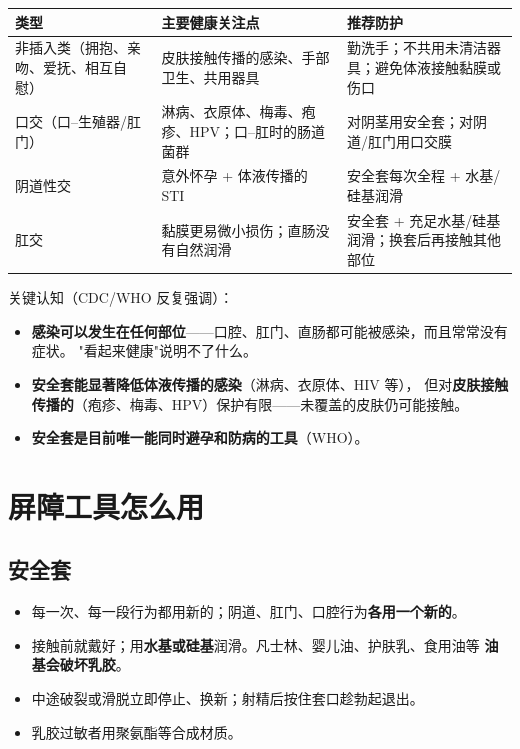 \begin{center}
\begin{tabularx}{\linewidth}{@{}l X X@{}}
\toprule
\textbf{类型} & \textbf{主要健康关注点} & \textbf{推荐防护} \\
\midrule
非插入类（拥抱、亲吻、爱抚、相互自慰）
  & 皮肤接触传播的感染、手部卫生、共用器具
  & 勤洗手；不共用未清洁器具；避免体液接触黏膜或伤口 \\
\addlinespace
口交（口--生殖器/肛门）
  & 淋病、衣原体、梅毒、疱疹、HPV；口--肛时的肠道菌群
  & 对阴茎用安全套；对阴道/肛门用口交膜 \\
\addlinespace
阴道性交
  & 意外怀孕 + 体液传播的 STI
  & 安全套每次全程 + 水基/硅基润滑 \\
\addlinespace
肛交
  & 黏膜更易微小损伤；直肠没有自然润滑
  & 安全套 + 充足水基/硅基润滑；换套后再接触其他部位 \\
\bottomrule
\end{tabularx}
\end{center}

关键认知（CDC/WHO 反复强调）：

\begin{itemize}[leftmargin=2em]
  \item \textbf{感染可以发生在任何部位}——口腔、肛门、直肠都可能被感染，而且常常没有症状。
        "看起来健康"说明不了什么。
  \item \textbf{安全套能显著降低体液传播的感染}（淋病、衣原体、HIV 等），
        但对\textbf{皮肤接触传播的}（疱疹、梅毒、HPV）保护有限——未覆盖的皮肤仍可能接触。
  \item \textbf{安全套是目前唯一能同时避孕和防病的工具}（WHO）。
\end{itemize}

\section{屏障工具怎么用}

\subsection*{安全套}

\begin{itemize}[leftmargin=2em]
  \item 每一次、每一段行为都用新的；阴道、肛门、口腔行为\textbf{各用一个新的}。
  \item 接触前就戴好；用\textbf{水基或硅基}润滑。凡士林、婴儿油、护肤乳、食用油等
        \textbf{油基会破坏乳胶}。
  \item 中途破裂或滑脱立即停止、换新；射精后按住套口趁勃起退出。
  \item 乳胶过敏者用聚氨酯等合成材质。
\end{itemize}

